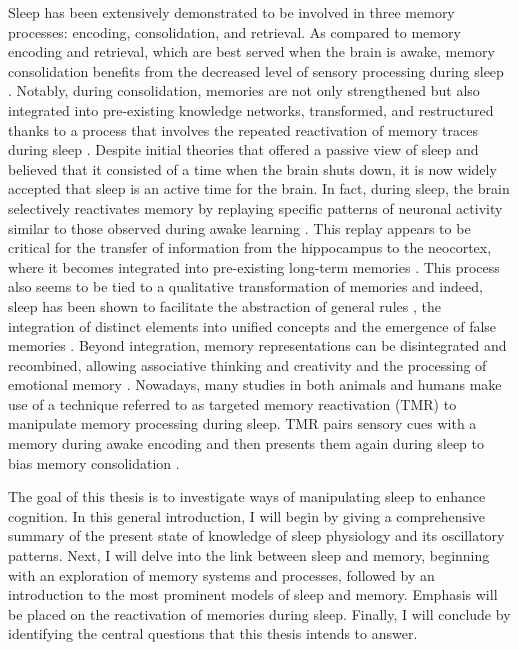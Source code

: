 Sleep has been extensively demonstrated to be involved in three memory processes: encoding, consolidation, and retrieval. As compared to memory encoding and retrieval, which are best served when the brain is awake, memory consolidation benefits from the decreased level of sensory processing during sleep \parencite{diekelmann_labile_2011,ellenbogen_role_2006,van_der_heijden_sleep_2022}. Notably, during consolidation, memories are not only strengthened but also integrated into pre-existing knowledge networks, transformed, and restructured thanks to a process that involves the repeated reactivation of memory traces during sleep \parencite{diekelmann_memory_2010,rasch_about_2013}. Despite initial theories that offered a passive view of sleep and believed that it consisted of a time when the brain shuts down, it is now widely accepted that sleep is an active time for the brain. In fact, during sleep, the brain selectively reactivates memory by replaying specific patterns of neuronal activity similar to those observed during awake learning \parencite{skaggs_replay_1996, wilson_reactivation_1994}. This replay appears to be critical for the transfer of information from the hippocampus to the neocortex, where it becomes integrated into pre-existing long-term memories \parencite{bergmann_sleep_2012, maquet_experience-dependent_2000, peigneux_are_2004,peigneux_neuroimaging_2015, rasch_about_2013,schonauer_decoding_2017,zhang_electrophysiological_2018}. This process also seems to be tied to a qualitative transformation of memories and indeed, sleep has been shown to facilitate the abstraction of general rules \parencite[e.g.,][]{durrant_sleep-dependent_2011,ellenbogen_human_2007,wagner_sleep_2004}, the integration of distinct elements into unified concepts \parencite[e.g.,][]{lewis_overlapping_2011} and the emergence of false memories \parencite[e.g.,][]{payne_role_2009}. Beyond integration, memory representations can be disintegrated and recombined, allowing associative thinking and creativity \parencite{cai_rem_2009,monaghan_sleep_2015,sio_sleep_2013} and the processing of emotional memory \parencite{helm_overnight_2010,hutchison_targeted_2021,walker_role_2009}. Nowadays, many studies in both animals and humans make use of a technique referred to as targeted memory reactivation (TMR) to manipulate memory processing during sleep. TMR pairs sensory cues with a memory during awake encoding and then presents them again during sleep to bias memory consolidation \parencite{hu_promoting_2020,oudiette_upgrading_2013,rasch_odor_2007}.

The goal of this thesis is to investigate ways of manipulating sleep to enhance cognition. In this general introduction, I will begin by giving a comprehensive summary of the present state of knowledge of sleep physiology and its oscillatory patterns. Next, I will delve into the link between sleep and memory, beginning with an exploration of memory systems and processes, followed by an introduction to the most prominent models of sleep and memory. Emphasis will be placed on the reactivation of memories during sleep. Finally, I will conclude by identifying the central questions that this thesis intends to answer.